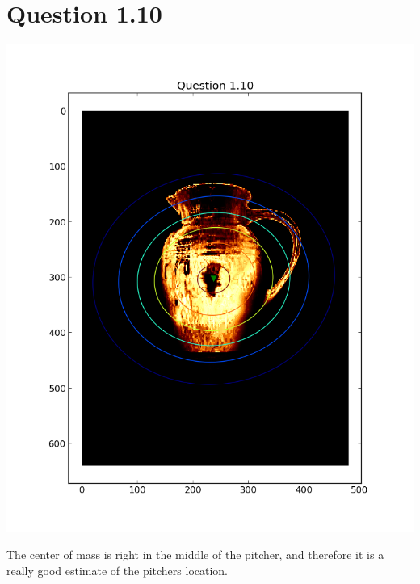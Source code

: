 \documentclass[11pt,a4paper]{article}
\begin{document}
\section{Question 1.10}
\includegraphics[width=1.1\textwidth]{figure_8.png}

The center of mass is right in the middle of the pitcher, and therefore it is a really
good estimate of the pitchers location.
\end{document}
